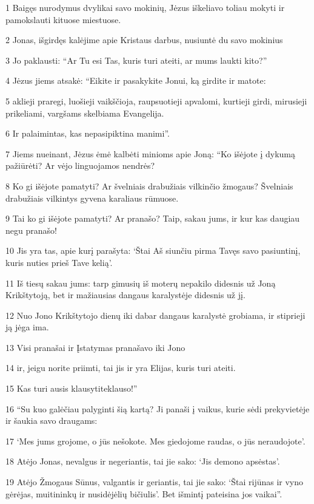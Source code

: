 \par 1 Baigęs nurodymus dvylikai savo mokinių, Jėzus iškeliavo toliau mokyti ir pamokslauti kituose miestuose. 
\par 2 Jonas, išgirdęs kalėjime apie Kristaus darbus, nusiuntė du savo mokinius 
\par 3 Jo paklausti: “Ar Tu esi Tas, kuris turi ateiti, ar mums laukti kito?” 
\par 4 Jėzus jiems atsakė: “Eikite ir pasakykite Jonui, ką girdite ir matote: 
\par 5 aklieji praregi, luošieji vaikščioja, raupsuotieji apvalomi, kurtieji girdi, mirusieji prikeliami, vargšams skelbiama Evangelija. 
\par 6 Ir palaimintas, kas nepasipiktina manimi”. 
\par 7 Jiems nueinant, Jėzus ėmė kalbėti minioms apie Joną: “Ko išėjote į dykumą pažiūrėti? Ar vėjo linguojamos nendrės? 
\par 8 Ko gi išėjote pamatyti? Ar švelniais drabužiais vilkinčio žmogaus? Švelniais drabužiais vilkintys gyvena karaliaus rūmuose. 
\par 9 Tai ko gi išėjote pamatyti? Ar pranašo? Taip, sakau jums, ir kur kas daugiau negu pranašo! 
\par 10 Jis yra tas, apie kurį parašyta: ‘Štai Aš siunčiu pirma Tavęs savo pasiuntinį, kuris nuties prieš Tave kelią’. 
\par 11 Iš tiesų sakau jums: tarp gimusių iš moterų nepakilo didesnis už Joną Krikštytoją, bet ir mažiausias dangaus karalystėje didesnis už jį. 
\par 12 Nuo Jono Krikštytojo dienų iki dabar dangaus karalystė grobiama, ir stiprieji ją jėga ima. 
\par 13 Visi pranašai ir Įstatymas pranašavo iki Jono 
\par 14 ir, jeigu norite priimti, tai jis ir yra Elijas, kuris turi ateiti. 
\par 15 Kas turi ausis klausyti­teklauso!” 
\par 16 “Su kuo galėčiau palyginti šią kartą? Ji panaši į vaikus, kurie sėdi prekyvietėje ir šaukia savo draugams: 
\par 17 ‘Mes jums grojome, o jūs nešokote. Mes giedojome raudas, o jūs neraudojote’. 
\par 18 Atėjo Jonas, nevalgus ir negeriantis, tai jie sako: ‘Jis demono apsėstas’. 
\par 19 Atėjo Žmogaus Sūnus, valgantis ir geriantis, tai jie sako: ‘Štai rijūnas ir vyno gėrėjas, muitininkų ir nusidėjėlių bičiulis’. Bet išmintį pateisina jos vaikai”. 
